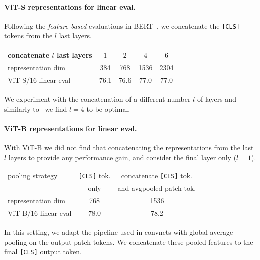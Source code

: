 \paragraph{ViT-S representations for linear eval.}
Following the \emph{feature-based} evaluations in BERT~\cite{devlin2018bert}, we concatenate the \texttt{[CLS]} tokens from the $l$ last layers.
\begin{table}[h!]
\vspace{-0.8em}
\small
  \centering
  \begin{tabular}{@{}l c c c c@{}}
	  concatenate $l$ last layers & $1$ & $2$ & $4$ & $6$\\
    \midrule
	  representation dim & 384 & 768 & 1536 & 2304 \\
	  ViT-S/16 linear eval & 76.1 & 76.6 & \colorbox{Light}{77.0} & 77.0 \\
  \end{tabular}
\vspace{-0.8em}
\end{table}
We experiment with the concatenation of a different number $l$ of layers and similarly to~\cite{devlin2018bert} we find $l=4$ to be optimal.

\paragraph{ViT-B representations for linear eval.}
With ViT-B we did not find that concatenating the representations from the last $l$ layers to provide any performance gain, and consider the final layer only ($l=1$).
\begin{table}[h!]
\small
\vspace{-0.8em}
  \centering
  \setlength{\tabcolsep}{4pt}
  \begin{tabular}{@{}l c c@{}}
	  pooling strategy & \texttt{[CLS]} tok. & concatenate \texttt{[CLS]} tok.\\
	  & only &  and avgpooled patch tok. \\
    \midrule
	  representation dim & 768 & 1536 \\
	  ViT-B/16 linear eval & 78.0 & \colorbox{Light}{78.2} \\
  \end{tabular}
\vspace{-0.8em}
\end{table}
In this setting, we adapt the pipeline used in convnets with global average pooling on the output patch tokens.
We concatenate these pooled features to the final \texttt{[CLS]} output token.


